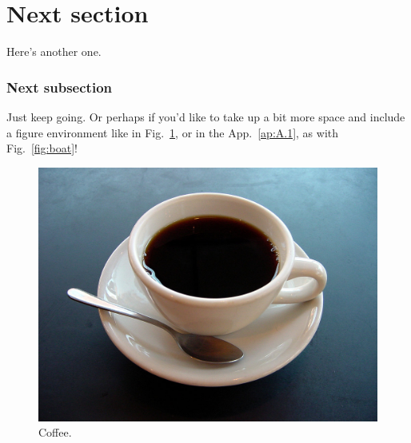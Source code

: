 \section{Next section}
\label{ch:1.2}
Here's another one.

\subsubsection*{Next subsection}
\label{ch:1.2.1}
Just keep going. \cite{article}
Or perhaps if you'd like to take up a bit more space
and include a figure environment
like in Fig.~\ref{fig:coffee}, 
or in the App.~\ref{ap:A.1}, 
as with Fig.~\ref{fig:boat}!

\begin{figure}[h!]
  \centering
  \includegraphics[width=\linewidth]{./fig/coffee.jpg}
  \caption{Coffee.}
  \label{fig:coffee}
\end{figure}
